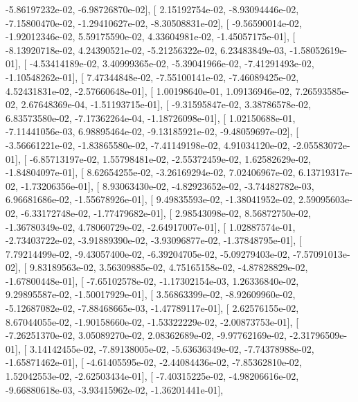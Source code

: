 \documentclass{article}
\begin{document}
         -5.86197232e-02,  -6.98726870e-02],
       [  2.15192754e-02,  -8.93094446e-02,  -7.15800470e-02,
         -1.29410627e-02,  -8.30508831e-02],
       [ -9.56590014e-02,  -1.92012346e-02,   5.59175590e-02,
          4.33604981e-02,  -1.45057175e-01],
       [ -8.13920718e-02,   4.24390521e-02,  -5.21256322e-02,
          6.23483849e-03,  -1.58052619e-01],
       [ -4.53414189e-02,   3.40999365e-02,  -5.39041966e-02,
         -7.41291493e-02,  -1.10548262e-01],
       [  7.47344848e-02,  -7.55100141e-02,  -7.46089425e-02,
          4.52431831e-02,  -2.57660648e-01],
       [  1.00198640e-01,   1.09136946e-02,   7.26593585e-02,
          2.67648369e-04,  -1.51193715e-01],
       [ -9.31595847e-02,   3.38786578e-02,   6.83573580e-02,
         -7.17362264e-04,  -1.18726098e-01],
       [  1.02150688e-01,  -7.11441056e-03,   6.98895464e-02,
         -9.13185921e-02,  -9.48059697e-02],
       [ -3.56661221e-02,  -1.83865580e-02,  -7.41149198e-02,
          4.91034120e-02,  -2.05583072e-01],
       [ -6.85713197e-02,   1.55798481e-02,  -2.55372459e-02,
          1.62582629e-02,  -1.84804097e-01],
       [  8.62654255e-02,  -3.26169294e-02,   7.02406967e-02,
          6.13719317e-02,  -1.73206356e-01],
       [  8.93063430e-02,  -4.82923652e-02,  -3.74482782e-03,
          6.96681686e-02,  -1.55678926e-01],
       [  9.49835593e-02,  -1.38041952e-02,   2.59095603e-02,
         -6.33172748e-02,  -1.77479682e-01],
       [  2.98543098e-02,   8.56872750e-02,  -1.36780349e-02,
          4.78060729e-02,  -2.64917007e-01],
       [  1.02887574e-01,  -2.73403722e-02,  -3.91889390e-02,
         -3.93096877e-02,  -1.37848795e-01],
       [  7.79214499e-02,  -9.43057400e-02,  -6.39204705e-02,
         -5.09279403e-02,  -7.57091013e-02],
       [  9.83189563e-02,   3.56309885e-02,   4.75165158e-02,
         -4.87828829e-02,  -1.67800448e-01],
       [ -7.65102578e-02,  -1.17302154e-03,   1.26336840e-02,
          9.29895587e-02,  -1.50017929e-01],
       [  3.56863399e-02,  -8.92609960e-02,  -5.12687082e-02,
         -7.88468665e-03,  -1.47789117e-01],
       [  2.62576155e-02,   8.67044055e-02,  -1.90158660e-02,
         -1.53322229e-02,  -2.00873753e-01],
       [ -7.26251370e-02,   3.05089270e-02,   2.08362689e-02,
         -9.97762169e-02,  -2.31796509e-01],
       [  3.14142455e-02,  -7.89138005e-02,  -5.63636349e-02,
         -7.74378988e-02,  -1.65871462e-01],
       [ -4.61405595e-02,  -2.44084436e-02,  -7.85362810e-02,
          1.52042553e-02,  -2.62503434e-01],
       [ -7.40315225e-02,  -4.98206616e-02,  -9.66880618e-03,
         -3.93415962e-02,  -1.36201441e-01],
\end{document}
